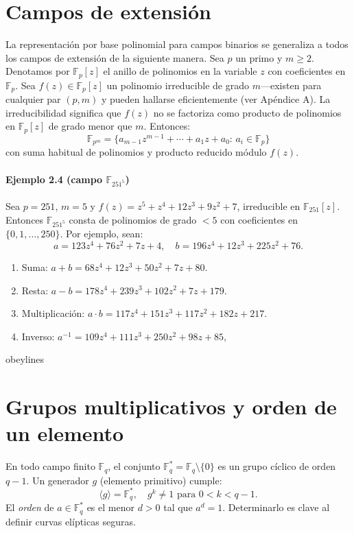 \section{Campos de extensión}
La representación por base polinomial para campos binarios se generaliza a todos los campos de extensión de la siguiente manera. Sea $p$ un primo y $m\ge2$. Denotamos por $\mathbb{F}_p[z]$ el anillo de polinomios en la variable $z$ con coeficientes en $\mathbb{F}_p$. Sea $f(z)\in\mathbb{F}_p[z]$ un polinomio irreducible de grado $m$—existen para cualquier par $(p,m)$ y pueden hallarse eficientemente (ver Apéndice A). La irreducibilidad significa que $f(z)$ no se factoriza como producto de polinomios en $\mathbb{F}_p[z]$ de grado menor que $m$. Entonces:
\[
  \mathbb{F}_{p^m}=\{a_{m-1}z^{m-1}+\cdots+a_1z+a_0:\,a_i\in\mathbb{F}_p\}
\]
con suma habitual de polinomios y producto reducido módulo $f(z)$.

\paragraph{Ejemplo 2.4 (campo $\mathbb{F}_{251^5}$)}
Sea $p=251$, $m=5$ y $f(z)=z^5+z^4+12z^3+9z^2+7$, irreducible en $\mathbb{F}_{251}[z]$. Entonces $\mathbb{F}_{251^5}$ consta de polinomios de grado \(<5\) con coeficientes en $\{0,1,\dots,250\}$. Por ejemplo, sean:
\[
  a=123z^4+76z^2+7z+4,\quad b=196z^4+12z^3+225z^2+76.
\]
\begin{enumerate}
  \item Suma: $a+b=68z^4+12z^3+50z^2+7z+80.$
  \item Resta: $a-b=178z^4+239z^3+102z^2+7z+179.$
  \item Multiplicación: $a\cdot b=117z^4+151z^3+117z^2+182z+217.$
  \item Inverso: $a^{-1}=109z^4+111z^3+250z^2+98z+85,$
\end{enumerate}
obeylines

\section{Grupos multiplicativos y orden de un elemento}
En todo campo finito $\mathbb{F}_q$, el conjunto $\mathbb{F}_q^*=\mathbb{F}_q\setminus\{0\}$ es un grupo cíclico de orden $q-1$. Un generador $g$ (elemento primitivo) cumple:
\[
  \langle g\rangle=\mathbb{F}_q^*,\quad g^k\neq1\text{ para }0<k<q-1.
\]
El \emph{orden} de $a\in\mathbb{F}_q^*$ es el menor $d>0$ tal que $a^d=1$. Determinarlo es clave al definir curvas elípticas seguras.
